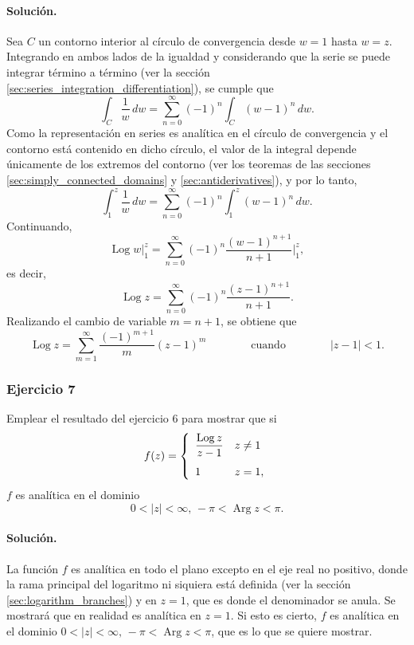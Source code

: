\documentclass[a4paper]{report}
\DeclareMathOperator{\Arg}{Arg}
\DeclareMathOperator{\Log}{Log}
\begin{document}
\paragraph{Solución.} Sea \(C\) un contorno interior al círculo de convergencia desde \(w=1\) hasta \(w=z\). Integrando en ambos lados de la igualdad y considerando que la serie se puede integrar término a término (ver la sección \ref{sec:series_integration_differentiation}), se cumple que 
\[
 \int_C\frac{1}{w}\,dw=\sum_{n=0}^\infty(-1)^n\int_C(w-1)^n\,dw.
\]
Como la representación en series es analítica en el círculo de convergencia y el contorno está contenido en dicho círculo, el valor de la integral depende únicamente de los extremos del contorno (ver los teoremas de las secciones \ref{sec:simply_connected_domains} y \ref{sec:antiderivatives}), y por lo tanto,
\[
 \int_1^z\frac{1}{w}\,dw=\sum_{n=0}^\infty(-1)^n\int_1^z(w-1)^n\,dw.
\]
Continuando,
\[
 \Log w\bigg|_1^z=\sum_{n=0}^\infty(-1)^n\frac{(w-1)^{n+1}}{n+1}\bigg|_1^z,
\]
es decir,
\[
 \Log z=\sum_{n=0}^\infty(-1)^n\frac{(z-1)^{n+1}}{n+1}.
\]
Realizando el cambio de variable \(m=n+1\), se obtiene que 
\[
 \Log z=\sum_{m=1}^\infty\frac{(-1)^{m+1}}{m}(z-1)^m
 \qquad\qquad\textrm{cuando}\qquad\qquad
 |z-1|<1.
\]

\subsubsection*{Ejercicio 7}

Emplear el resultado del ejercicio 6 para mostrar que si
\[
 f(z)=
 \left\{ 
 \begin{array}{ll}
  \dfrac{\Log z}{z-1} & z\neq1\\[\bigskipamount]
  1 & z=1,
 \end{array}
 \right.
\]
\(f\) es analítica en el dominio 
\[
 0<|z|<\infty,\,-\pi<\Arg z<\pi. 
\]

\paragraph{Solución.} La función \(f\) es analítica en todo el plano excepto en el eje real no positivo, donde la rama principal del logaritmo ni siquiera está definida (ver la sección \ref{sec:logarithm_branches}) y en \(z=1\), que es donde el denominador se anula. Se mostrará que en realidad es analítica en \(z=1\). Si esto es cierto, \(f\) es analítica en el dominio \(0<|z|<\infty,\,-\pi<\Arg z<\pi\), que es lo que se quiere mostrar.
\end{document}
